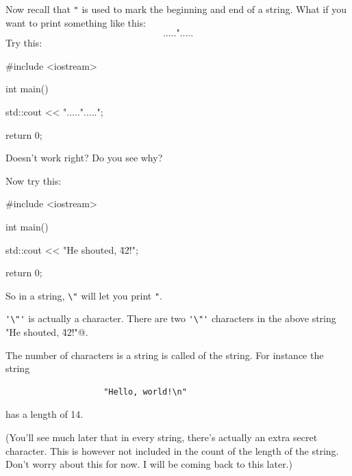 Now recall that \verb!"! is used to mark the beginning and end of a string. What if you want to print something like this:
\[
	\texttt{.....".....}
\]
Try this:
\begin{console}
#include <iostream>

int main()
{
    std::cout << ".....".....";

    return 0;
}
\end{console}
Doesn't work right? Do you see why?

Now try this:
\begin{console}
#include <iostream>

int main()
{
    std::cout << "He shouted, \"42!\"\n";

    return 0;
}
\end{console}

So in a string, \verb!\"! will let you print \verb!"!. 

\verb!'\"'! is actually a character. 
There are two \verb!'\"'! characters in the above string  
\verb@"He shouted, \"42!\"\n"@.


















The number of characters is a string is called 
of the string. For instance the string 
\begin{verbatim}
                    "Hello, world!\n"
\end{verbatim}
has a length of 14. 




(You'll see much later that in every string, there's actually an extra secret character. This is however not included in the count of the length of the string. Don't worry about this for now. I will be coming back to this later.)









